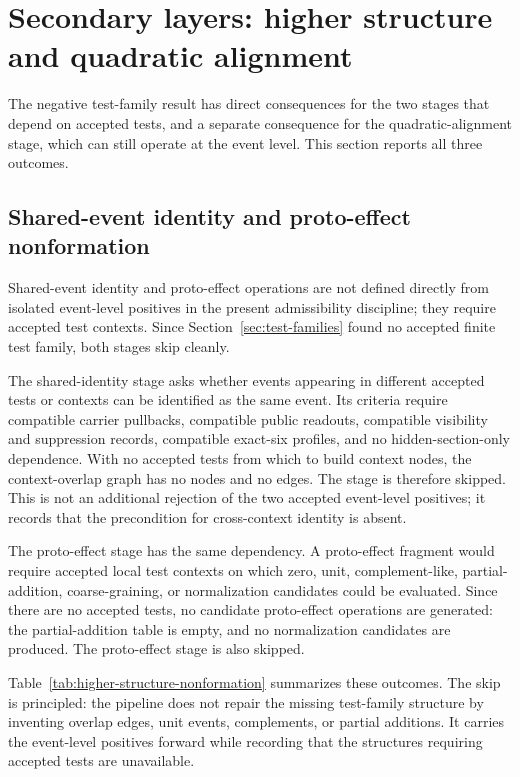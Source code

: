 \documentclass[11pt]{article}
\theoremstyle{definition}
\begin{document}
 \section{Secondary layers: higher structure and quadratic alignment}
\label{sec:higher-structure}

The negative test-family result has direct consequences for the two stages that depend on accepted tests, and a separate consequence for the quadratic-alignment stage, which can still operate at the event level. This section reports all three outcomes.

\subsection{Shared-event identity and proto-effect nonformation}

Shared-event identity and proto-effect operations are not defined directly from isolated event-level positives in the present admissibility discipline; they require accepted test contexts. Since Section~\ref{sec:test-families} found no accepted finite test family, both stages skip cleanly.

The shared-identity stage asks whether events appearing in different accepted tests or contexts can be identified as the same event. Its criteria require compatible carrier pullbacks, compatible public readouts, compatible visibility and suppression records, compatible exact-six profiles, and no hidden-section-only dependence. With no accepted tests from which to build context nodes, the context-overlap graph has no nodes and no edges. The stage is therefore skipped. This is not an additional rejection of the two accepted event-level positives; it records that the precondition for cross-context identity is absent.

The proto-effect stage has the same dependency. A proto-effect fragment would require accepted local test contexts on which zero, unit, complement-like, partial-addition, coarse-graining, or normalization candidates could be evaluated. Since there are no accepted tests, no candidate proto-effect operations are generated: the partial-addition table is empty, and no normalization candidates are produced. The proto-effect stage is also skipped.

Table~\ref{tab:higher-structure-nonformation} summarizes these outcomes. The skip is principled: the pipeline does not repair the missing test-family structure by inventing overlap edges, unit events, complements, or partial additions. It carries the event-level positives forward while recording that the structures requiring accepted tests are unavailable.
\end{document}
